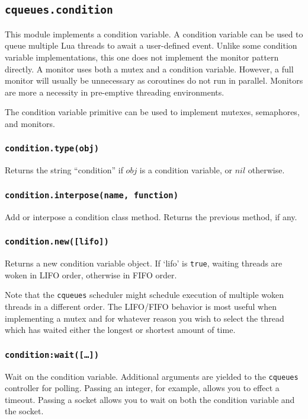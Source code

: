 \documentclass[11pt, oneside]{memoir}
\newcommand{\cqueues}[0]{\texttt{cqueues} }
\newcommand{\fn}[1]{\texttt{#1} }
\newcounter{toccols}
\newenvironment{Module}[1]{
	\subsection{\texttt{#1}}
	\addtocontents{toc}{
		\protect\begin{multicols}{\value{toccols}}
	}
}{
	\addtocontents{toc}{\protect\end{multicols}}
}
\begin{document}
\begin{Module}{cqueues.condition}

This module implements a condition variable. A condition variable can be used to queue multiple Lua threads to await a user-defined event. Unlike some condition variable implementations, this one does not implement the monitor pattern directly. A monitor uses both a mutex and a condition variable. However, a full monitor will usually be unnecessary as coroutines do not run in parallel. Monitors are more a necessity in pre-emptive threading environments.

The condition variable primitive can be used to implement mutexes, semaphores, and monitors.

\subsubsection[\fn{condition.type}]{\fn{condition.type(obj)}}

Returns the string ``condition'' if $obj$ is a condition variable, or $nil$ otherwise.

\subsubsection[\fn{condition.interpose}]{\fn{condition.interpose(name, function)}}

Add or interpose a condition class method. Returns the previous method, if any.

\subsubsection[\fn{condition.new}]{\fn{condition.new([lifo])}}

Returns a new condition variable object. If `lifo' is \texttt{true}, waiting threads are woken
in LIFO order, otherwise in FIFO order.

Note that the \cqueues scheduler might schedule execution of multiple woken threads in a different order. The LIFO/FIFO behavior is most useful when implementing a mutex and for whatever reason you wish to select the thread which has waited either the longest or shortest amount of time.

\subsubsection[\fn{condition:wait}]{\fn{condition:wait([…])}}

Wait on the condition variable. Additional arguments are yielded to the \cqueues controller for polling. Passing an integer, for example, allows you to effect a timeout. Passing a socket allows you to wait on both the condition variable and the socket.


\end{Module}
\end{document}
